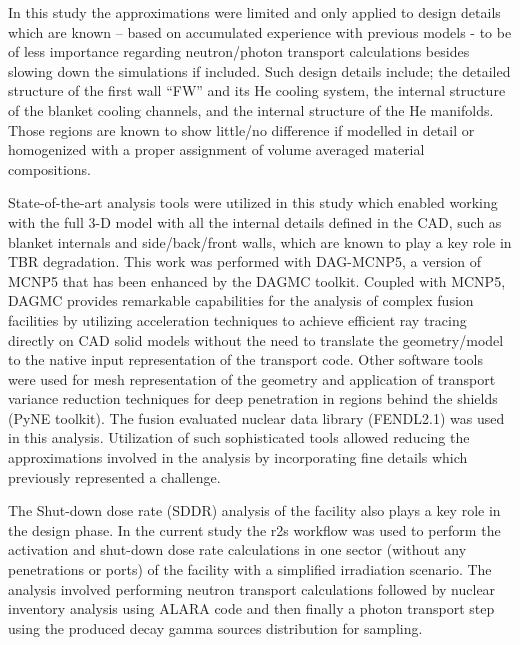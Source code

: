 \documentclass[12pt, letterpaper]{elsarticle}
\begin{document}
In this study the approximations were limited and only applied to design details which are known – based on accumulated experience with previous models - to be of less importance regarding neutron/photon transport calculations besides slowing down the simulations if included. Such design details include; the detailed structure of the first wall “FW” and its He cooling system, the internal structure of the blanket cooling channels, and the internal structure of the He manifolds. Those regions are known to show little/no difference if modelled in detail or homogenized with a proper assignment of volume averaged material compositions.\vspace{5mm}

State-of-the-art analysis tools were utilized in this study which enabled working with the full 3-D model with all the internal details defined in the CAD, such as blanket internals and side/back/front walls, which are known to play a key role in TBR degradation. This work was performed with DAG-MCNP5, a version of MCNP5 \cite{ref_4} that has been enhanced by the DAGMC \cite{ref_5} toolkit. Coupled with MCNP5, DAGMC provides remarkable capabilities for the analysis of complex fusion facilities by utilizing acceleration techniques to achieve efficient ray tracing directly on CAD solid models without the need to translate the geometry/model to the native input representation of the transport code. Other software tools were used for mesh representation of the geometry and application of transport variance reduction techniques for deep penetration in regions behind the shields (PyNE \cite{ref_6} toolkit). The fusion evaluated nuclear data library (FENDL2.1)\cite{ref_7} was used in this analysis. Utilization of such sophisticated tools allowed reducing the approximations involved in the analysis by incorporating fine details which previously represented a challenge.\vspace{5mm}

The Shut-down dose rate (SDDR) analysis of the facility also plays a key role in the design phase. In the current study the r2s \cite{ref_8, ref_9} workflow was used to perform the activation and shut-down dose rate calculations in one sector (without any penetrations or ports) of the facility with a simplified irradiation scenario. The analysis involved performing neutron transport calculations followed by nuclear inventory analysis using ALARA \cite{ref_10} code and then finally a photon transport step using the produced decay gamma sources distribution for sampling.   
\end{document}
